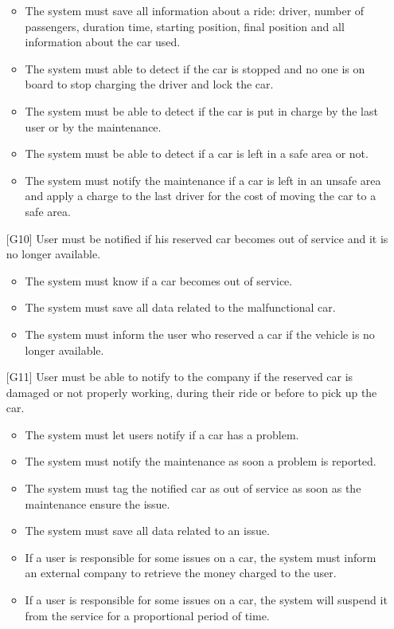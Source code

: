 \documentclass[10pt, a4paper,titlepage]{article}
\begin{document}
\begin{itemize}
\begin{itemize}
\item The system must save all information about a ride: driver, number of passengers, duration time, starting position, final position and all information about the car used.
\item The system must able to detect if the car is stopped and no one is on board to stop charging the driver and lock the car.
\item The system must be able to detect if the car is put in charge by the last user or by the maintenance.
\item The system must be able to detect if a car is left in a safe area or not.
\item The system must notify the maintenance if a car is left in an unsafe area and apply a charge to the last driver for the cost of moving the car to a safe area.
\end{itemize}
\item [{[G10]}] User must be notified if his reserved car becomes out of service and it is no longer available.
\begin{itemize}
\item The system must know if a car becomes out of service.
\item The system must save all data related to the malfunctional car.
\item The system must inform the user who reserved a car if the vehicle is no longer available.
\end{itemize}
\item[{[G11]}] User must be able to notify to the company if the reserved car is damaged or not properly working, during their ride or before to pick up the car.
\begin{itemize}
\item The system must let users notify if a car has a problem.
\item The system must notify the maintenance as soon a problem is reported.
\item The system must tag the notified car as out of service as soon as the maintenance ensure the issue.
\item The system must save all data related to an issue.
\item If a user is responsible for some issues on a car, the system must inform an external company to retrieve the money charged to the user.
\item If a user is responsible for some issues on a car, the system will suspend it from the service for a proportional period of time.
\end{itemize}

\end{itemize}
\end{document}
